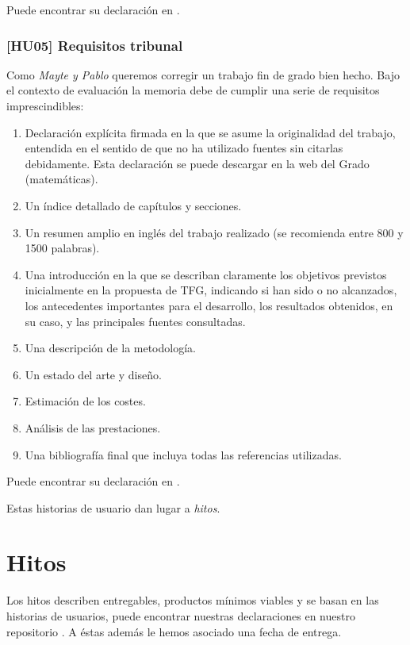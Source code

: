 Puede encontrar su declaración en \cite{TFG-Estudio-de-las-redes-neuronales-HU04}.


\subsubsection*{[HU05] Requisitos tribunal} \label{HUO6}
Como \textit{Mayte y Pablo} queremos corregir un trabajo fin de grado bien hecho. 
Bajo el contexto de evaluación la memoria debe de cumplir una serie de requisitos imprescindibles:

\begin{enumerate}
    \item Declaración explícita firmada en la que se asume la originalidad del trabajo, entendida en el sentido de que no ha utilizado fuentes sin citarlas debidamente. Esta declaración se puede descargar en la web del Grado (matemáticas).
    \item Un índice detallado de capítulos y secciones.
    \item Un resumen amplio en inglés del trabajo realizado (se recomienda entre 800 y 1500 palabras).
    \item Una introducción en la que se describan claramente los objetivos previstos inicialmente en la propuesta de TFG, indicando si han sido o no alcanzados, los antecedentes importantes para el desarrollo, los resultados obtenidos, en su caso, y las principales fuentes consultadas.
    \item Una descripción de la metodología.
    \item Un estado del arte y diseño.
    \item Estimación de los costes.
    \item Análisis de las prestaciones.
    \item Una bibliografía final que incluya todas las referencias utilizadas.
\end{enumerate}
Puede encontrar su declaración en \cite{TFG-Estudio-de-las-redes-neuronales-HU06}.



Estas historias de usuario dan lugar a \textit{hitos}. 

\section{Hitos} \label{ch00:hitos} 

Los hitos describen entregables, productos mínimos viables y se basan en las historias de usuarios,
puede encontrar nuestras declaraciones en nuestro repositorio \cite{TFG-Estudio-de-las-redes-neuronales-milestones}. 
A éstas además le hemos asociado una fecha de entrega. 


